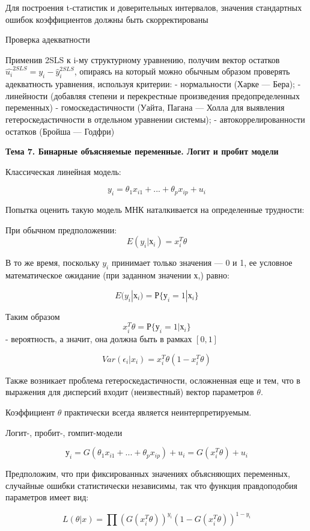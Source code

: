 \documentclass[a4paper,8pt]{article} %
\begin{document}
Для построения t-статистик и доверительных интервалов, значения стандартных ошибок коэффициентов должны быть скорректированы


Проверка адекватности

Применив 2SLS  к i-му структурному уравнению, получим вектор остатков $  \hat{u_i} ^{2SLS} = y_i -   \hat{y}_i^{2SLS}$, опираясь на который  можно обычным образом проверять адекватность уравнения, используя
критерии:
- нормальности (Харке — Бера);
- линейности (добавляя степени и перекрестные произведения предопределенных переменных)
- гомоскедастичности (Уайта, Пагана — Холла для выявления гетероскедастичности в отдельном уравнении системы);
- автокоррелированности остатков (Бройша — Годфри)




\textbf{Тема 7. Бинарные объясняемые переменные. Логит и пробит модели} 

Классическая линейная модель:

$$y_i = \theta_1 x_{i1} + ... + \theta_p x_{ip} + u_i$$


Попытка оценить такую модель МНК наталкивается на определенные трудности: 

При обычном предположении:
$$ E(y_i | х_i) = x_i^T \theta $$


В то же время, поскольку $y_i$  принимает только значения — 0 и 1, ее условное математическое ожидание (при заданном
значении х,) равно:

$$ E(y_i | х_i)   =   Р \{ у_i  = 1| х_i  \} $$  


Таким образом $$ x_i^T \theta =  Р \{ у_i  = 1| х_i  \} $$ - вероятность, а значит, она должна быть в рамках $[0,1]$ 

$$Var(\epsilon_i|x_i) = x_i^T\theta(1-x_i^T\theta)$$

Также возникает проблема гетероскедастичности,
осложненная еще и тем, что в выражения для дисперсий
входит (неизвестный) вектор параметров $\theta$.


Коэффициент $\theta$ практически всегда   является неинтерпретируемым. 


Логит-, пробит-, гомпит-модели


$$ у_i = G(\theta_1 x_{i1} + ... + \theta_p x_{ip} ) + u_i =  G(x_{i}^T \theta) + u_i $$


Предположим, что при фиксированных значениях объясняющих переменных, случайные ошибки статистически независимы, так что функция правдоподобия параметров имеет вид:

$$ L(\theta|x) = \prod  (G(x_{i}^T \theta))^{y_i} (1- G(x_{i}^T \theta))^{1 - y_i} $$
\end{document}
